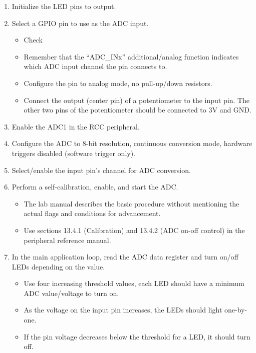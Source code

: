 \documentclass[11pt,fleqn]{book} %
\begin{document}
\begin{enumerate} 
    \item Initialize the LED pins to output.
    \item Select a GPIO pin to use as the ADC input.
    \begin{itemize}
        \item Check 
        \item Remember that the ``ADC\_INx'' additional/analog function indicates which ADC input channel the pin connects to.
        \item Configure the pin to analog mode, no pull-up/down resistors.
        \item Connect the output (center pin) of a potentiometer to the input pin. The other two pins of the potentiometer should be connected to 3V and GND.
    \end{itemize} 
    
    \begin{warning}
        
    \end{warning}

    \item Enable the ADC1 in the RCC peripheral. 
    \item Configure the ADC to 8-bit resolution, continuous conversion mode, hardware triggers disabled (software trigger only).
    \item Select/enable the input pin's channel for ADC conversion.
    \item Perform a self-calibration, enable, and start the ADC.
    \begin{itemize}
        \item The lab manual describes the basic procedure without mentioning the actual flags and conditions for advancement. 
        \item Use sections 13.4.1 (Calibration) and 13.4.2 (ADC on-off control) in the peripheral reference manual. 
    \end{itemize}
    \item In the main application loop, read the ADC data register and turn on/off LEDs depending on the value.
    \begin{itemize}
        \item Use four increasing threshold values, each LED should have a minimum ADC value/voltage to turn on.
        \item As the voltage on the input pin increases, the LEDs should light one-by-one.
        \item If the pin voltage decreases below the threshold for a LED, it should turn off. 
    \end{itemize}
\end{enumerate}
\end{document}
